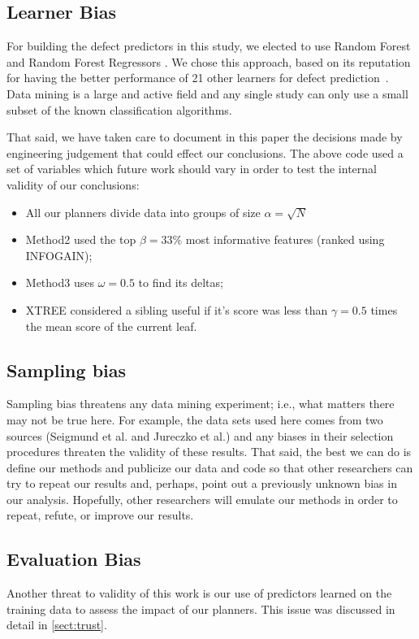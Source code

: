 \documentclass{sig-alternate}
\newcommand{\bi}{\begin{itemize}}
\newcommand{\ei}{\end{itemize}}
\newcommand{\tion}[1]{\textsection\ref{sect:#1}}
\begin{document}
\subsection{ Learner Bias}
For building the defect predictors in this study, we elected
to use  Random Forest  and Random Forest Regressors .
We chose this approach,  based on its reputation for having the better  performance of 
21 other learners for defect prediction~\cite{lessmann}.
Data mining is a
large and active field and any single study can only use a small
subset of the known classification algorithms.  

That said, we have taken care to document in this paper the decisions made by engineering
judgement that could effect our conclusions. The above code used a set of variables which future
work should vary in order to test the internal validity of our conclusions:
\bi
\item All our planners divide data into groups of size $\alpha=\sqrt{N}$
\item Method2 used the top $\beta=33\%$ most informative features (ranked using INFOGAIN);
\item Method3 uses  $\omega=0.5$ to find its deltas;
\item XTREE considered a sibling useful if it's score was less than $\gamma=0.5$ times the mean score of the current leaf.
 \ei

\subsection{  Sampling bias} 
Sampling bias threatens any data mining experiment; i.e., what matters
there may not be true here. For example, the data sets used here comes from two sources
(Seigmund et al. and Jureczko et al.) and any biases in their selection procedures
threaten the validity of these results. 
That said,
the best we can do is define our methods and publicize our data and code so that other researchers can
try to repeat our results and, perhaps, point out a previously unknown bias
in our analysis. Hopefully, other researchers will emulate our methods in
order to repeat, refute, or improve our results. 



\subsection{  Evaluation Bias}\label{sect:coc}
Another threat to validity of this work is our use
of predictors learned on the training data to assess the impact of our planners.
This issue was discussed in detail in \tion{trust}. 
\end{document}
